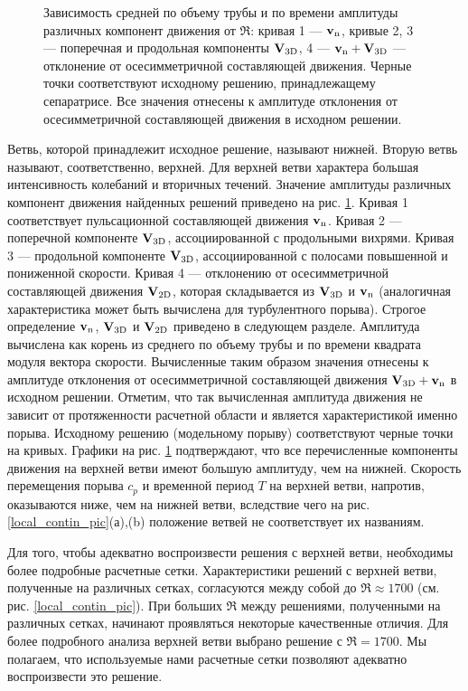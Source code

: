 \begin{figure}
\caption{Зависимость средней по объему трубы и по времени амплитуды различных компонент движения от $\Re$: кривая 1 --- $\mathbf{v}_\mathrm{n}$, кривые 2, 3 --- поперечная и продольная компоненты $\mathbf{V}_\mathrm{3D}$, 4 --- $\mathbf{v}_\mathrm{n} + \mathbf{V}_\mathrm{3D}$ --- отклонение от осесимметричной составляющей движения. Черные точки соответствуют исходному решению, принадлежащему сепаратрисе. Все значения отнесены к амплитуде отклонения от осесимметричной составляющей движения в исходном решении.}
\label{local_contin_amp_pic}
\end{figure}

Ветвь, которой принадлежит исходное решение, называют нижней. Вторую ветвь называют, соответственно, верхней. Для верхней ветви характера большая интенсивность колебаний и вторичных течений. Значение амплитуды различных компонент движения найденных решений приведено на рис. \ref{local_contin_amp_pic}. Кривая 1 соответствует пульсационной составляющей движения $\mathbf{v}_\mathrm{n}$. Кривая 2 --- поперечной компоненте $\mathbf{V}_\mathrm{3D}$, ассоциированной с продольными вихрями. Кривая 3 --- продольной компоненте $\mathbf{V}_\mathrm{3D}$, ассоциированной с полосами повышенной и пониженной скорости. Кривая 4 --- отклонению от осесимметричной составляющей движения $\mathbf{V}_\mathrm{2D}$, которая складывается из $\mathbf{V}_\mathrm{3D}$ и $\mathbf{v}_\mathrm{n}$ (аналогичная характеристика может быть вычислена для турбулентного порыва). Строгое определение $\mathbf{v}_n$, $\mathbf{V}_\mathrm{3D}$ и $\mathbf{V}_\mathrm{2D}$ приведено в следующем разделе. Амплитуда вычислена как корень из среднего по объему трубы и по времени квадрата модуля вектора скорости. Вычисленные таким образом значения отнесены к амплитуде отклонения от осесимметричной составляющей движения $\mathbf{V}_\mathrm{3D} + \mathbf{v}_\mathrm{n}$ в исходном решении. Отметим, что так вычисленная амплитуда движения не зависит от протяженности расчетной области и является характеристикой именно порыва. Исходному решению (модельному порыву) соответствуют черные точки на кривых. Графики на рис. \ref{local_contin_amp_pic} подтверждают, что все перечисленные компоненты движения на верхней ветви имеют большую амплитуду, чем на нижней. Скорость перемещения порыва $c_p$ и временной период $T$ на верхней ветви, напротив, оказываются ниже, чем на нижней ветви, вследствие чего на рис. \ref{local_contin_pic}(а),(b) положение ветвей не соответствует их названиям. 

Для того, чтобы адекватно воспроизвести решения с верхней ветви, необходимы более подробные расчетные сетки. Характеристики решений с верхней ветви, полученные на различных сетках, согласуются между собой до $\Re \approx 1700$ (см. рис. \ref{local_contin_pic}). При больших $\Re$ между решениями, полученными на различных сетках, начинают проявляться некоторые качественные отличия. Для более подробного анализа верхней ветви выбрано решение с $\Re = 1700$. Мы полагаем, что используемые нами расчетные сетки позволяют адекватно воспроизвести это решение. 

